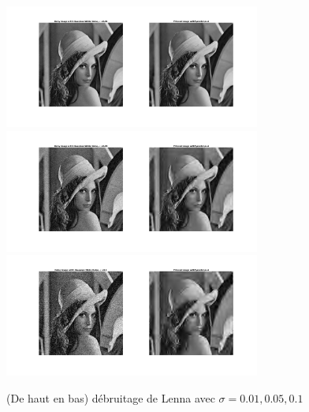 \documentclass[a4paper,12pt, openany, twoside]{article}
\theoremstyle{break}
\begin{document}
\begin{figure}[!htp]
  \centering
  \includegraphics[width=0.75\textwidth]{denoise_lenna1}\vfill
  \includegraphics[width=0.75\textwidth]{denoise_lenna5}\vfill
  \includegraphics[width=0.75\textwidth]{denoise_lenna10}\vfill
  \caption{(De haut en bas) débruitage de Lenna avec $\sigma=0.01, 0.05, 0.1$}
\end{figure}
\end{document}
